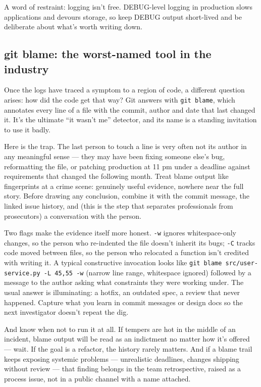 A word of restraint: logging isn't free. DEBUG-level logging in production slows applications and devours storage, so keep DEBUG output short-lived and be deliberate about what's worth writing down.



\subsection{git blame: the worst-named tool in the industry}


Once the logs have traced a symptom to a region of code, a different question arises: how did the code get that way? Git answers with \texttt{git blame}, which annotates every line of a file with the commit, author and date that last changed it. It's the ultimate ``it wasn't me'' detector, and its name is a standing invitation to use it badly.


Here is the trap. The last person to touch a line is very often not its author in any meaningful sense — they may have been fixing someone else's bug, reformatting the file, or patching production at 11 pm under a deadline against requirements that changed the following month. Treat blame output like fingerprints at a crime scene: genuinely useful evidence, nowhere near the full story. Before drawing any conclusion, combine it with the commit message, the linked issue history, and (this is the step that separates professionals from prosecutors) a conversation with the person.


Two flags make the evidence itself more honest. \texttt{-w} ignores whitespace-only changes, so the person who re-indented the file doesn't inherit its bugs; \texttt{-C} tracks code moved between files, so the person who relocated a function isn't credited with writing it. A typical constructive invocation looks like \texttt{git blame src/user-service.py -L 45,55 -w} (narrow line range, whitespace ignored) followed by a message to the author asking what constraints they were working under. The usual answer is illuminating: a hotfix, an outdated spec, a review that never happened. Capture what you learn in commit messages or design docs so the next investigator doesn't repeat the dig.


And know when not to run it at all. If tempers are hot in the middle of an incident, blame output will be read as an indictment no matter how it's offered — wait. If the goal is a refactor, the history rarely matters. And if a blame trail keeps exposing systemic problems — unrealistic deadlines, changes shipping without review — that finding belongs in the team retrospective, raised as a process issue, not in a public channel with a name attached.



